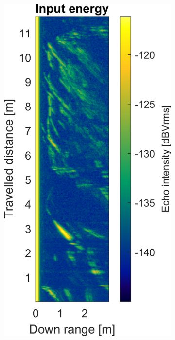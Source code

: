 \begin{figure}[htbp]
    \centering
    \begin{subfigure}[t]{0.475\linewidth}
        \centering
        \includegraphics[width=\linewidth,max height=.475\textheight]{gfx/results/homecinema_input.png}

\end{subfigure}
\end{figure}
